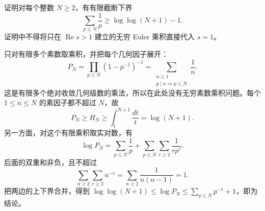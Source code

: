 \begin{exercise}\label{b3:ex:25-7}
证明对每个整数 \(N\ge2\)，有有限截断下界
\[
 \sum_{p\le N}\frac1p\ge\log\log(N+1)-1.
\]
证明中不得将只在 \(\operatorname{Re}s>1\) 建立的无穷 Euler 乘积直接代入 \(s=1\)。
\end{exercise}
\begin{solution}
只对有限多个素数取乘积，并把每个几何因子展开：
\[
 P_N=\prod_{p\le N}(1-p^{-1})^{-1}
 =\sum_{\substack{n\ge1\\p\mid n\Rightarrow p\le N}}\frac1n.
\]
这是有限多个绝对收敛几何级数的乘法，所以在此处没有无穷素数乘积问题。每个 \(1\le n\le N\) 的素因子都不超过 \(N\)，故
\[
 P_N\ge H_N\ge\int_1^{N+1}\frac{dt}{t}=\log(N+1).
\]
另一方面，对这个有限乘积取实对数，有
\[
 \log P_N
 =\sum_{p\le N}\frac1p
  +\sum_{p\le N}\sum_{r\ge2}\frac1{r p^r}.
\]
后面的双重和非负，且不超过
\[
 \sum_{n\ge2}\sum_{r\ge2}n^{-r}
 =\sum_{n\ge2}\frac1{n(n-1)}=1.
\]
把两边的上下界合并，得到
\(\log\log(N+1)\le\log P_N\le\sum_{p\le N}p^{-1}+1\)，即为结论。
\end{solution}

